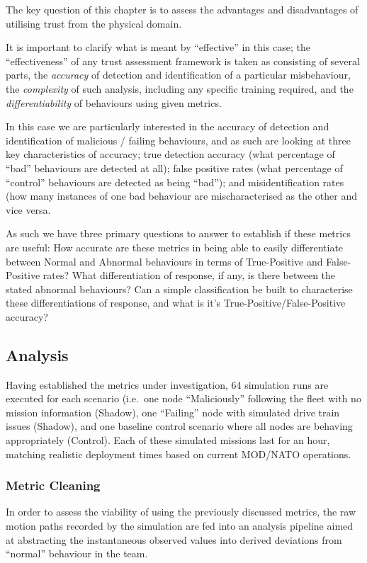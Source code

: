 The key question of this chapter is to assess the advantages and disadvantages of utilising trust from the physical domain. 

It is important to clarify what is meant by ``effective'' in this case; the ``effectiveness'' of any trust assessment framework is taken as consisting of several parts, the \emph{accuracy} of detection and identification of a particular misbehaviour, the \emph{complexity} of such analysis, including any specific training required, and the \emph{differentiability} of behaviours using given metrics.

In this case we are particularly interested in the accuracy of detection and identification of malicious / failing behaviours, and as such are looking at three key characteristics of accuracy; true detection accuracy (what percentage of ``bad'' behaviours are detected at all); false positive rates (what percentage of ``control'' behaviours are detected as being ``bad''); and misidentification rates (how many instances of one bad behaviour are mischaracterised as the other and vice versa.

As such we have three primary questions to answer to establish if these metrics are useful: 
How accurate are these metrics in being able to easily differentiate between Normal and Abnormal behaviours in terms of True-Positive and False-Positive rates?
What differentiation of response, if any, is there between the stated abnormal behaviours?
Can a simple classification be built to characterise these differentiations of response, and what is it's True-Positive/False-Positive accuracy?


\subsection{Analysis}
Having established the metrics under investigation, 64 simulation runs are executed for each scenario (i.e.\ one node ``Maliciously'' following the fleet with no mission information (Shadow), one ``Failing'' node with simulated drive train issues (Shadow), and one baseline control scenario where all nodes are behaving appropriately (Control).
Each of these simulated missions last for an hour, matching realistic deployment times based on current MOD/NATO operations\cite{Bolster2014a}.

\subsubsection{Metric Cleaning}
In order to assess the viability of using the previously discussed metrics, the raw motion paths recorded by the simulation are fed into an analysis pipeline aimed at abstracting the instantaneous observed values into derived deviations from ``normal'' behaviour in the team.


